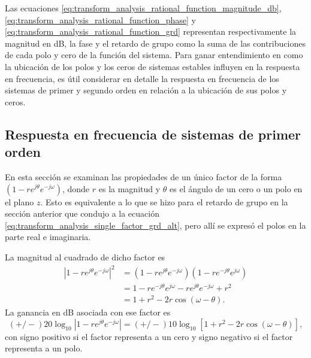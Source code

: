 \documentclass[a4paper]{report}
\begin{document}
Las ecuaciones \ref{eq:transform_analysis_rational_function_magnitude_db}, \ref{eq:transform_analysis_rational_function_phase} y \ref{eq:transform_analysis_rational_function_grd} representan respectivamente la magnitud en dB, la fase y el retardo de grupo como la suma de las contribuciones de cada polo y cero de la función del sistema. Para ganar entendimiento en como la ubicación de los polos y los ceros de sistemas estables influyen en la respuesta en frecuencia, es útil considerar en detalle la respuesta en frecuencia de los sistemas de primer y segundo orden en relación a la ubicación de sus polos y ceros.

\subsection{Respuesta en frecuencia de sistemas de primer orden}\label{sec:transform_analysis_first_order_freq_response}

En esta sección se examinan las propiedades de un único factor de la forma \((1-re^{j\theta}e^{-j\omega})\), donde \(r\) es la magnitud y \(\theta\) es el ángulo de un cero o un polo en el plano \(z\). Esto es equivalente a lo que se hizo para el retardo de grupo en la sección anterior que condujo a la ecuación \ref{eq:transform_analysis_single_factor_grd_alt}, pero allí se expresó el polos en la parte real e imaginaria.

La magnitud al cuadrado de dicho factor es
\begin{align}
 |1-re^{j\theta}e^{-j\omega}|^2&=(1-re^{j\theta}e^{-j\omega})(1-re^{-j\theta}e^{j\omega})\nonumber\\
   &=1-re^{-j\theta}e^{j\omega}-re^{j\theta}e^{-j\omega}+r^2\nonumber\\
   &=1+r^2-2r\cos(\omega-\theta).\label{eq:transform_analysis_first_order_freq_response_magnitude_alt}
\end{align}
La ganancia en dB asociada con ese factor es
\begin{equation}\label{eq:transform_analysis_first_order_freq_response_magnitude}
 (+/-)20\log_{10}|1-re^{j\theta}e^{-j\omega}|=(+/-)10\log_{10}[1+r^2-2r\cos(\omega-\theta)], 
\end{equation}
con signo positivo si el factor representa a un cero y signo negativo si el factor representa a un polo.
\end{document}
